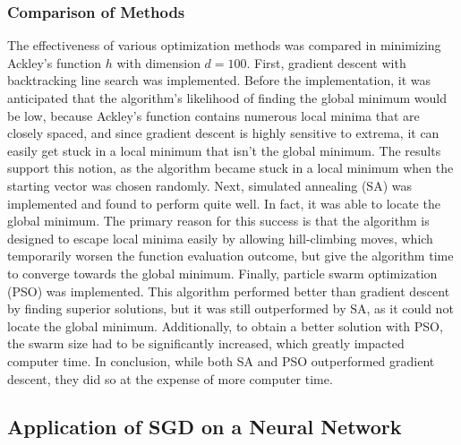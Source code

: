 \subsubsection{Comparison of Methods}
The effectiveness of various optimization methods was compared in minimizing Ackley's function $h$ with dimension $d=100$. First, gradient descent with backtracking line search was implemented. Before the implementation, it was anticipated that the algorithm's likelihood of finding the global minimum would be low, because Ackley's function contains numerous local minima that are closely spaced, and since gradient descent is highly sensitive to extrema, it can easily get stuck in a local minimum that isn't the global minimum. The results support this notion, as the algorithm became stuck in a local minimum when the starting vector was chosen randomly. Next, simulated annealing (SA) was implemented and found to perform quite well. In fact, it was able to locate the global minimum. The primary reason for this success is that the algorithm is designed to escape local minima easily by allowing hill-climbing moves, which temporarily worsen the function evaluation outcome, but give the algorithm time to converge towards the global minimum. Finally, particle swarm optimization (PSO) was implemented. This algorithm performed better than gradient descent by finding superior solutions, but it was still outperformed by SA, as it could not locate the global minimum. Additionally, to obtain a better solution with PSO, the swarm size had to be significantly increased, which greatly impacted computer time. In conclusion, while both SA and PSO outperformed gradient descent, they did so at the expense of more computer time.

\subsection{Application of SGD on a Neural Network}
